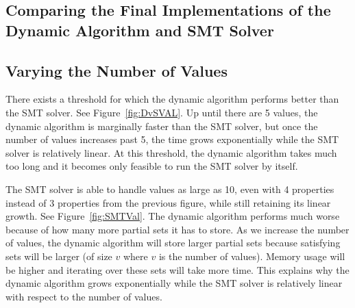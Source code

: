 \documentclass[pageno]{jpaper}
\begin{document}
\subsection{Comparing the Final Implementations of the Dynamic Algorithm and SMT Solver}

\subsection{Varying the Number of Values}

There exists a threshold for which the dynamic algorithm performs better than the SMT solver. See Figure~\ref{fig:DvSVAL}. Up until there are 5 values, the dynamic algorithm is marginally faster than the SMT solver, but once the number of values increases past 5, the time grows exponentially while the SMT solver is relatively linear. At this threshold, the dynamic algorithm takes much too long and it becomes only feasible to run the SMT solver by itself. 

The SMT solver is able to handle values as large as 10, even with 4 properties instead of 3 properties from the previous figure, while still retaining its linear growth. See Figure~\ref{fig:SMTVal}. The dynamic algorithm performs much worse because of how many more partial sets it has to store. As we increase the number of values, the dynamic algorithm will store larger partial sets because satisfying sets will be larger (of size $v$ where $v$ is the number of values). Memory usage will be higher and iterating over these sets will take more time. This explains why the dynamic algorithm grows exponentially while the SMT solver is relatively linear with respect to the number of values. 
\end{document}
